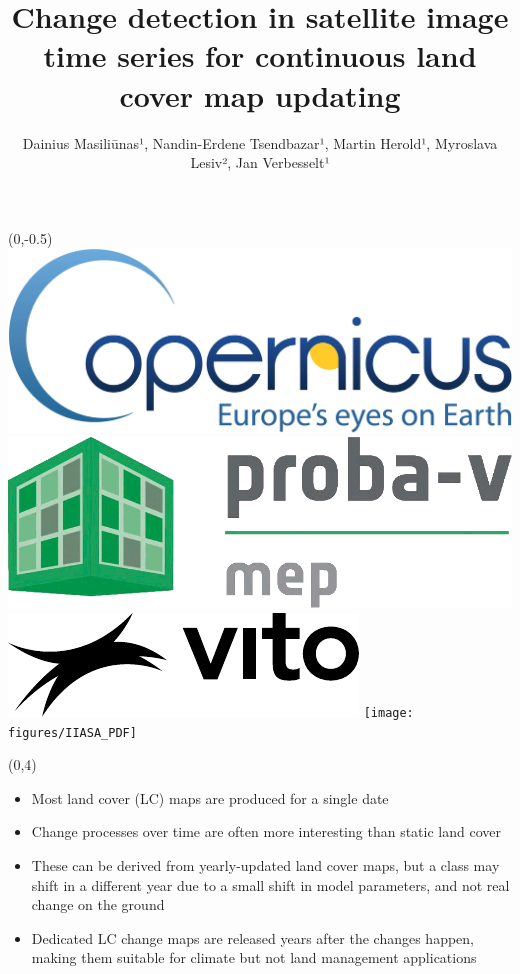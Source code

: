 \documentclass[20pt]{beamer}
\title{Change detection in satellite image time series for continuous land cover map updating}
\author{Dainius Masiliūnas¹, Nandin-Erdene Tsendbazar¹, Martin Herold¹, Myroslava Lesiv², Jan Verbesselt¹}
\begin{document}
  \beamertemplatenavigationsymbolsempty
  \begin{frame}{} 

	\begin{textblock}{15}(0,-0.5)
        \includegraphics[height=0.5\TPVertModule]{figures/Copernicus.jpg} \hskip 1cm
		\includegraphics[height=0.5\TPVertModule]{figures/PVMEP.png} \hskip 1cm
		\includegraphics[height=0.5\TPVertModule]{figures/vito-black} \hskip 1cm
		\texttt{[image: figures/IIASA\_PDF]}
	\end{textblock}

	\begin{textblock}{7}(0,4)
	  \Line
        \begin{itemize}
         \item Most land cover (LC) maps are produced for a single date
         \item Change processes over time are often more interesting than static land cover
         \item These can be derived from yearly-updated land cover maps, but a class may shift in a different year due to a small shift in model parameters, and not real change on the ground
         \item Dedicated LC change maps are released years after the changes happen, making them suitable for climate but not land management applications
        \end{itemize}
	\end{textblock}
	

\end{frame}
\end{document}
